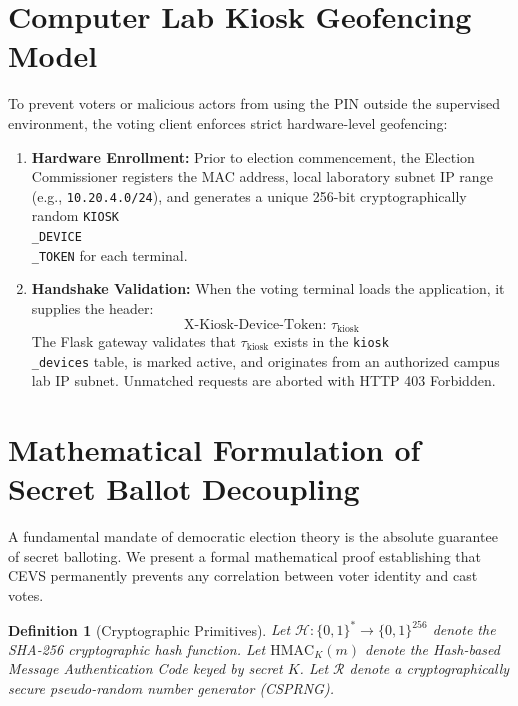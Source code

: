 \documentclass[12pt,a4paper,oneside]{report}
\newtheorem{definition}{Definition}[chapter]
\begin{document}
\section{Computer Lab Kiosk Geofencing Model}
To prevent voters or malicious actors from using the PIN outside the supervised environment, the voting client enforces strict hardware-level geofencing:
\begin{enumerate}
    \item \textbf{Hardware Enrollment:} Prior to election commencement, the Election Commissioner registers the MAC address, local laboratory subnet IP range (e.g., \texttt{10.20.4.0/24}), and generates a unique 256-bit cryptographically random \texttt{KIOSK\\_DEVICE\\_TOKEN} for each terminal.
    \item \textbf{Handshake Validation:} When the voting terminal loads the application, it supplies the header:
    \begin{equation}
        \text{X-Kiosk-Device-Token: } \tau_{\text{kiosk}}
    \end{equation}
    The Flask gateway validates that $\tau_{\text{kiosk}}$ exists in the \texttt{kiosk\\_devices} table, is marked active, and originates from an authorized campus lab IP subnet. Unmatched requests are aborted with HTTP 403 Forbidden.
\end{enumerate}

\section{Mathematical Formulation of Secret Ballot Decoupling}
A fundamental mandate of democratic election theory is the absolute guarantee of secret balloting. We present a formal mathematical proof establishing that CEVS permanently prevents any correlation between voter identity and cast votes.

\begin{definition}[Cryptographic Primitives]
Let $\mathcal{H}: \{0,1\}^* \to \{0,1\}^{256}$ denote the SHA-256 cryptographic hash function. Let $\text{HMAC}_K(m)$ denote the Hash-based Message Authentication Code keyed by secret $K$. Let $\mathcal{R}$ denote a cryptographically secure pseudo-random number generator (CSPRNG).
\end{definition}
\end{document}
